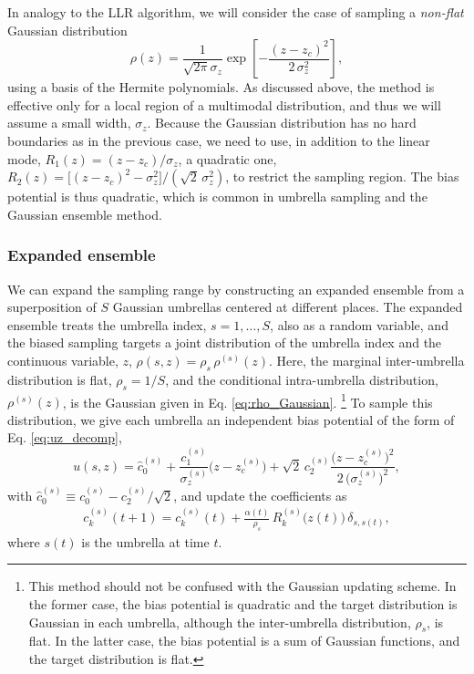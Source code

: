 \documentclass[reprint, superscriptaddress, floatfix]{revtex4-1}
\begin{document}
In analogy to the LLR algorithm,
we will consider the case of sampling
a \emph{non-flat} Gaussian distribution
\begin{equation}
  \rho(z)
  =
  \frac{1}{\sqrt{2\pi} \sigma_z}
  \exp\left[ - \frac{(z-z_c)^2}{2\,\sigma_z^2} \right]
  ,
  \label{eq:rho_Gaussian}
\end{equation}
using a basis of the Hermite polynomials\cite{arfken}.
%
As discussed above,
the method is effective only for
a local region of a multimodal distribution,
and thus we will assume a small width, $\sigma_z$.
%
Because the Gaussian distribution has no hard boundaries
as in the previous case,
we need to use,
in addition to the linear mode,
$R_1(z) = (z - z_c)/\sigma_z$,
a quadratic one,
$R_2(z) = \bigl[(z - z_c)^2 - \sigma_z^2\bigr] /\left(\sqrt 2 \, \sigma_z^2\right)$,
to restrict the sampling region.
%
The bias potential is thus quadratic,
which is common in umbrella sampling\cite{maragliano2006, *abrams2008, zhu2012}
and the Gaussian ensemble method\cite{hetherington1987,
*challa1988, *costeniuc2006, neuhaus2006, *neuhaus2007}.



\subsubsection{\label{sec:st}
Expanded ensemble}



We can expand the sampling range
by constructing an expanded ensemble
from a superposition of $S$ Gaussian umbrellas
centered at different places.
%
The expanded ensemble treats
the umbrella index, $s = 1, \dots, S$,
also as a random variable,
and the biased sampling targets a joint distribution
of the umbrella index
and the continuous variable, $z$,
$\rho(s, z) = \rho_s \, \rho^{(s)}(z)$.
%
Here,
the marginal inter-umbrella distribution is flat,
$\rho_s = 1/S$,
and the conditional intra-umbrella distribution, $\rho^{(s)}(z)$,
is the Gaussian given in Eq. \eqref{eq:rho_Gaussian}.
\footnote{This method
  should not be confused with the Gaussian updating scheme.
  In the former case, the bias potential is quadratic
  and the target distribution is Gaussian in each umbrella,
  although the inter-umbrella distribution, $\rho_s$, is flat.
  In the latter case, the bias potential is a sum of
  Gaussian functions, and the target distribution
  is flat.}
%
To sample this distribution, we give each umbrella
an independent bias potential of the form of Eq. \eqref{eq:uz_decomp},
%
\begin{equation}
  u(s, z)
  = \hat c_0^{(s)}
  + \frac{c_1^{(s)}}{\sigma_z^{(s)}} \bigl(z - z_c^{(s)}\bigr)
  + \sqrt 2 \, c_2^{(s)} \frac{\bigl(z-z_c^{(s)}\bigr)^2}
  {2 \, \bigl( \sigma_z^{(s)} \bigr)^2}
  ,
  \label{eq:u_age}
\end{equation}
%
with $\hat c_0^{(s)} \equiv c_0^{(s)} - c_2^{(s)}/\sqrt 2$,
and update the coefficients as
%
\begin{align}
  c_k^{(s)}(t+1) = c_k^{(s)}(t)
  + \frac{ \alpha(t) } { \rho_s } \, R_k^{(s)}\bigl( z(t) \bigr) \,
    \delta_{s, s(t)}
  ,
  \label{eq:ck_age_update}
\end{align}
%
where $s(t)$ is the umbrella at time $t$.
%
\end{document}
